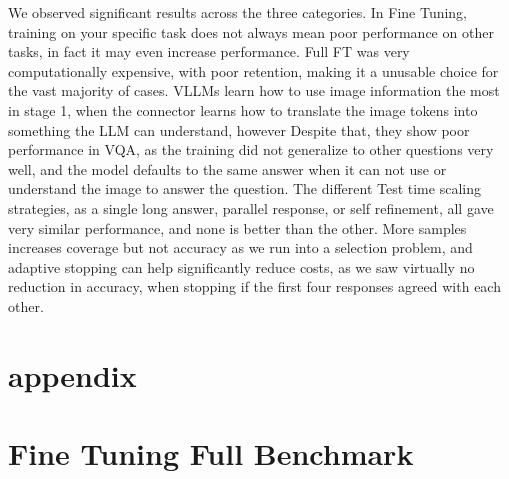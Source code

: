\documentclass{article}
\begin{document}
We observed significant results across the three categories. In Fine Tuning, training on your specific task does not always mean poor performance on other tasks,
in fact it may even increase performance. Full FT was very computationally expensive, with poor retention, making it a unusable choice for the vast majority of cases.
VLLMs learn how to use image information the most in stage 1, when the connector learns how to translate the image tokens into something the LLM can understand, however Despite
that, they show poor performance in VQA, as the training did not generalize to other questions very well, and the model defaults to the same answer when it can not use or understand the image
to answer the question. The different Test time scaling strategies, as a single long answer, parallel response, or self refinement, all gave very similar performance, and none is better than the other.
More samples increases coverage but not accuracy as we run into a selection problem, and adaptive stopping can help significantly reduce costs, as we saw virtually no reduction in 
accuracy, when stopping if the first four responses agreed with each other. 

\small


\normalsize

\clearpage

\appendix
\section*{appendix}

\section{Fine Tuning Full Benchmark}
\end{document}

